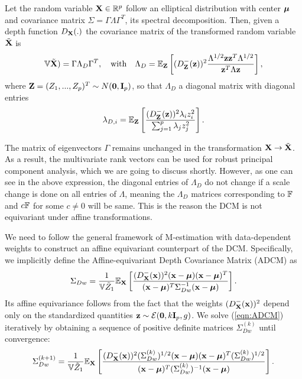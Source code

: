 \begin{Theorem} \label{Theorem:covform}
Let the random variable ${\mathbf{X}} \in \mathbb{R}^p$ follow an elliptical distribution with center ${\boldsymbol{\mu}}$ and covariance matrix $\Sigma = \Gamma\Lambda\Gamma^T$, its spectral decomposition. Then, given a depth function $D_{\mathbf{X}}(.)$ the covariance matrix of the transformed random variable $\tilde{{\mathbf{X}}}$ is
\begin{equation} \label{equation:covformEq1}
{\mathbb{V}} \tilde {{\mathbf{X}}}) = \Gamma \Lambda_{D} \Gamma^T,\quad\mbox{with}\quad \Lambda_{D} = \mathbb E_{\mathbf{Z}} \left[ (D^-_{\mathbf{Z}}({\bf{z}}))^2 \frac{\Lambda^{1/2} {\bf{z}} {\bf{z}}^T \Lambda^{1/2}}{{\bf{z}}^T \Lambda {\bf{z}}} \right],
\end{equation}
where ${\mathbf{Z}} = (Z_1,...,Z_p)^T \sim N({\bf 0}, {\mathbf{I}}_p)$, so that $\Lambda_{D}$ a diagonal matrix with diagonal entries
%
$$
\lambda_{D,i} = \mathbb E_{\mathbf{Z}} \left[ \frac{(D^-_{\mathbf{Z}}({\bf{z}}))^2 \lambda_i z_i^2}{\sum_{j=1}^p \lambda_j z_j^2} \right].
$$
\end{Theorem}

The matrix of eigenvectors $\Gamma$ remains unchanged in the transformation ${\mathbf{X}} \rightarrow \tilde {{\mathbf{X}}}$. As a result, the multivariate rank vectors can be used for robust principal component analysis, which we are going to discuss shortly. However, as one can see in the above expression, the diagonal entries of $\Lambda_{D}$ do not change if a scale change is done on all entries of $\Lambda$, meaning the $\Lambda_{D}$ matrices corresponding to ${\mathbb{F}}$ and $c {\mathbb{F}}$ for some $c \neq 0$ will be same. This is the reason the DCM is not equivariant under affine transformations.

We need to follow the general framework of M-estimation with data-dependent weights \citep{HuberBook81} to construct an affine equivariant counterpart of the DCM. Specifically, we implicitly define the Affine-equivariant Depth Covariance Matrix (ADCM) as
%
\begin{equation} \label{eqn:ADCM}
\Sigma_{Dw} = \frac{1}{ {\mathbb{V}} \tilde Z_1 } {\mathbb{E}}_{\mathbf{X}} \left[ \frac{(D^-_{\mathbf{X}}({\bf{x}}))^2 ({\bf{x}} - {\boldsymbol{\mu}}) ({\bf{x}} - {\boldsymbol{\mu}})^T}{({\bf{x}} - {\boldsymbol{\mu}})^T \Sigma_{Dw}^{-1} ({\bf{x}} - {\boldsymbol{\mu}})} \right].
\end{equation}
%
Its affine equivariance follows from the fact that the weights $(D^-_{\mathbf{X}} ({\bf{x}}))^2$ depend only on the standardized quantities ${\bf{z}} \sim \mathcal{E} ({\bf 0}, k {\mathbf{I}}_p, g)$. We solve (\ref{eqn:ADCM}) iteratively by obtaining a sequence of positive definite matrices $\Sigma^{(k)}_{Dw}$ until convergence:
%
$$
\Sigma^{(k+1)}_{Dw} = \frac{1}{{\mathbb{V}} \tilde Z_1 } {\mathbb{E}}_{\mathbf{X}} \left[ \frac{(D^-_{\mathbf{X}}({\bf{x}}))^2 (\Sigma^{(k)}_{Dw})^{1/2} ({\bf{x}} - {\boldsymbol{\mu}}) ({\bf{x}} - {\boldsymbol{\mu}})^T (\Sigma^{(k)}_{Dw})^{1/2}}{({\bf{x}} - {\boldsymbol{\mu}})^T (\Sigma^{(k)}_{Dw})^{-1} ({\bf{x}} - {\boldsymbol{\mu}})} \right].
$$
%

